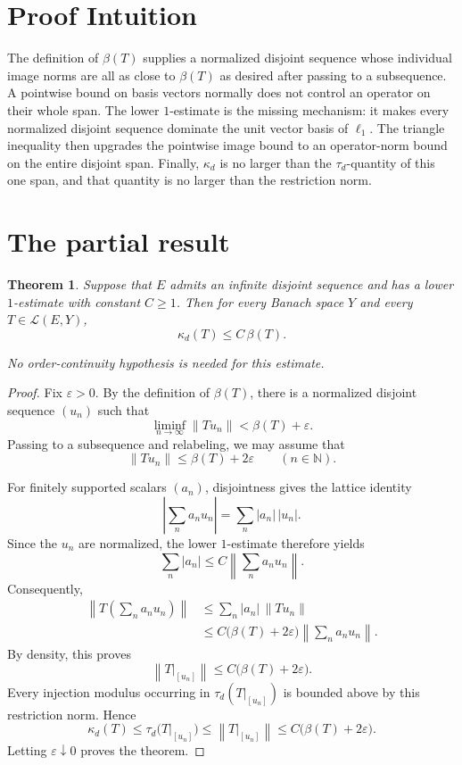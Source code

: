 \documentclass[11pt]{article}
\newtheorem{theorem}{Theorem}
\newcommand{\Lin}{\mathcal L}
\begin{document}
\section*{Proof Intuition}

The definition of $\beta(T)$ supplies a normalized disjoint sequence whose
individual image norms are all as close to $\beta(T)$ as desired after
passing to a subsequence.  A pointwise bound on basis vectors normally does
not control an operator on their whole span.  The lower $1$-estimate is the
missing mechanism: it makes every normalized disjoint sequence dominate the
unit vector basis of $\ell_1$.  The triangle inequality then upgrades the
pointwise image bound to an operator-norm bound on the entire disjoint span.
Finally, $\kappa_d$ is no larger than the $\tau_d$-quantity of this one
span, and that quantity is no larger than the restriction norm.

\section*{The partial result}

\begin{theorem}\label{thm:lower-one}
Suppose that $E$ admits an infinite disjoint sequence and has a lower
$1$-estimate with constant $C\geq1$.
Then for every Banach space $Y$ and every $T\in\Lin(E,Y)$,
\[
  \kappa_d(T)\leq C\,\beta(T).
\]
\par\noindent
No order-continuity hypothesis is needed for this estimate.
\end{theorem}

\begin{proof}
Fix $\varepsilon>0$.  By the definition of $\beta(T)$, there is a
normalized disjoint sequence $(u_n)$ such that
\[
  \liminf_{n\to\infty}\|Tu_n\|<\beta(T)+\varepsilon.
\]
Passing to a subsequence and relabeling, we may assume that
\[
  \|Tu_n\|\leq\beta(T)+2\varepsilon
  \qquad(n\in\mathbb N).
\]

For finitely supported scalars $(a_n)$, disjointness gives the lattice
identity
\[
  \left|\sum_n a_nu_n\right|=\sum_n|a_n|\,|u_n|.
\]
Since the $u_n$ are normalized, the lower $1$-estimate therefore yields
\[
  \sum_n|a_n|
  \leq C\left\|\sum_n a_nu_n\right\|.
\]
Consequently,
\begin{align*}
  \left\|T\left(\sum_n a_nu_n\right)\right\|
  &\leq\sum_n|a_n|\,\|Tu_n\|\\
  &\leq C\bigl(\beta(T)+2\varepsilon\bigr)
       \left\|\sum_n a_nu_n\right\|.
\end{align*}
By density, this proves
\[
  \left\|T|_{[u_n]}\right\|
  \leq C\bigl(\beta(T)+2\varepsilon\bigr).
\]
\newpage
Every injection modulus occurring in
$\tau_d(T|_{[u_n]})$ is bounded above by this restriction norm.  Hence
\[
  \kappa_d(T)
  \leq\tau_d\bigl(T|_{[u_n]}\bigr)
  \leq\left\|T|_{[u_n]}\right\|
  \leq C\bigl(\beta(T)+2\varepsilon\bigr).
\]
Letting $\varepsilon\downarrow0$ proves the theorem.
\end{proof}
\end{document}
